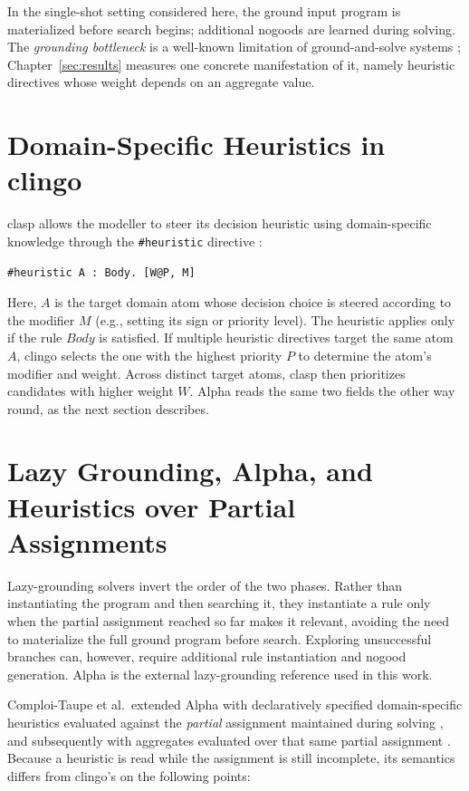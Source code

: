 In the single-shot setting considered here, the ground input program is materialized before search begins; additional nogoods are learned during solving. The \emph{grounding bottleneck} is a well-known limitation of ground-and-solve systems \cite{comploi2023domain}; Chapter~\ref{sec:results} measures one concrete manifestation of it, namely heuristic directives whose weight depends on an aggregate value.

\section{Domain-Specific Heuristics in clingo}
\label{sec:bg-heuristics}

clasp allows the modeller to steer its decision heuristic using domain-specific knowledge through the \texttt{\#heuristic} directive \cite{gebser2013heuristics}:

\begin{verbatim}
#heuristic A : Body. [W@P, M]
\end{verbatim}

Here, $A$ is the target domain atom whose decision choice is steered according to the modifier $M$ (e.g., setting its sign or priority level). The heuristic applies only if the rule $Body$ is satisfied. If multiple heuristic directives target the same atom $A$, clingo selects the one with the highest priority $P$ to determine the atom's modifier and weight. Across distinct target atoms, clasp then prioritizes candidates with higher weight $W$. Alpha reads the same two fields the other way round, as the next section describes.

\section{Lazy Grounding, Alpha, and Heuristics over Partial Assignments}
\label{sec:bg-alpha}

Lazy-grounding solvers invert the order of the two phases. Rather than instantiating the program and then searching it, they instantiate a rule only when the partial assignment reached so far makes it relevant, avoiding the need to materialize the full ground program before search. Exploring unsuccessful branches can, however, require additional rule instantiation and nogood generation. Alpha \cite{weinzierl2017blending} is the external lazy-grounding reference used in this work.

Comploi-Taupe et al.\ extended Alpha with declaratively specified domain-specific heuristics evaluated against the \emph{partial} assignment maintained during solving \cite{comploi2023domain}, and subsequently with aggregates evaluated over that same partial assignment \cite{comploi2023dynamicAggregates}. Because a heuristic is read while the assignment is still incomplete, its semantics differs from clingo's on the following points:

